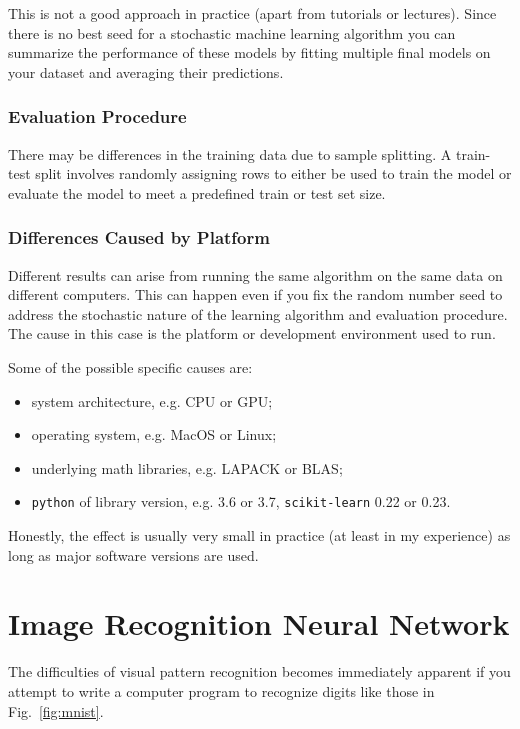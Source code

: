 This is not a good approach in practice (apart from tutorials or lectures). Since there is no best seed for a stochastic machine learning algorithm you can summarize the performance of these models by fitting multiple final models on your dataset and averaging their predictions.

\subsubsection{Evaluation Procedure}

There may be differences in the training data due to sample splitting.
A train-test split involves randomly assigning rows to either be used to train the model or evaluate the model to meet a predefined train or test set size.

\subsubsection{Differences Caused by Platform}

Different results can arise from running the same algorithm on the same data on different computers.
This can happen even if you fix the random number seed to address the stochastic nature of the learning algorithm and evaluation procedure. The cause in this case is the platform or development environment used to run.

Some of the possible specific causes are:
\begin{itemize}
\tightlist
\item system architecture, e.g. CPU or GPU;
\item operating system, e.g. MacOS or Linux;
\item underlying math libraries, e.g. LAPACK or BLAS;
\item \texttt{python} of library version, e.g. 3.6 or 3.7, \texttt{scikit-learn} 0.22 or 0.23.
\end{itemize}

Honestly, the effect is usually very small in practice (at least in my experience) as long as major software versions are used.

\section{Image Recognition Neural Network}
\label{neural-net-to-recognize-handwritten-digits}

The difficulties of visual pattern recognition becomes immediately apparent if you attempt to write a computer program to recognize digits like those in Fig.~\ref{fig:mnist}.


